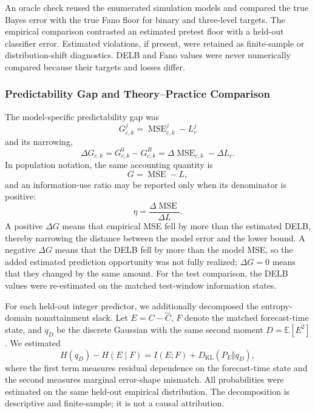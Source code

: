 \documentclass[applsci,article,accept,moreauthors]{Definitions/mdpi}
\begin{document}
An oracle check reused the enumerated simulation models and compared the
true Bayes error with the true Fano floor for binary and three-level targets.
The empirical comparison contrasted an estimated pretest floor with a held-out
classifier error. Estimated violations, if present, were retained as
finite-sample or distribution-shift diagnostics. DELB and Fano values were
never numerically compared because their targets and losses differ.

\subsubsection{Predictability Gap and Theory--Practice Comparison}
\label{subsec:gap_methods}
\label{subsec:gap_efficiency}

The model-specific predictability gap was
\begin{equation}
G^j_{c,k}=\operatorname{MSE}^{j}_{c,k}-L^j_c
\label{eq:empirical_gap}
\end{equation}
and its narrowing,
\begin{equation}
\Delta G_{c,k}
=G^0_{c,k}-G^B_{c,k}
=\Delta\operatorname{MSE}_{c,k}-\Delta L_c.
\label{eq:empirical_gap_narrowing}
\end{equation}
In population notation, the same accounting quantity is
\begin{equation}
G=\operatorname{MSE}-L,
\label{eq:prediction_gap}
\end{equation}
and an information-use ratio may be reported only when its denominator is
positive:
\begin{equation}
\eta=\frac{\Delta\operatorname{MSE}}{\Delta L}.
\label{eq:bound_efficiency}
\end{equation}
A positive \(\Delta G\) means that empirical MSE fell by more than the
estimated DELB, thereby narrowing the distance between the model error and
the lower bound. A negative \(\Delta G\) means that the DELB fell by more than
the model MSE, so the added estimated prediction opportunity was not fully
realized; \(\Delta G=0\) means that they changed by the same amount. For the test comparison,
the DELB values were re-estimated on the matched test-window information
states.

{For each held-out integer predictor, we additionally decomposed the
entropy-domain nonattainment slack. Let \(E=C-\widehat C\), \(F\) denote the
matched forecast-time state, and \(q_D\) be the discrete Gaussian with the
same second moment \(D=\mathbb E[E^2]\). We estimated
\[
H(q_D)-H(E\mid F)=I(E;F)+D_{\mathrm{KL}}(P_E\Vert q_D),
\]
where the first term measures residual dependence on the forecast-time state
and the second measures marginal error-shape mismatch. All probabilities were
estimated on the same held-out empirical distribution. The decomposition is
descriptive and finite-sample; it is not a causal attribution.}
\end{document}
